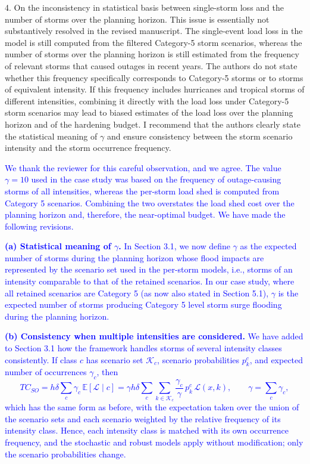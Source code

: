 \documentclass[authoryear,preprint,review,12pt]{elsarticle}\usepackage{amssymb}
\begin{document}
\bigskip

4. On the inconsistency in statistical basis between single-storm loss and the number of storms over the planning horizon. This issue is essentially not substantively resolved in the revised manuscript. The single-event load loss in the model is still computed from the filtered Category-5 storm scenarios, whereas the number of storms over the planning horizon is still estimated from the frequency of relevant storms that caused outages in recent years. The authors do not state whether this frequency specifically corresponds to Category-5 storms or to storms of equivalent intensity. If this frequency includes hurricanes and tropical storms of different intensities, combining it directly with the load loss under Category-5 storm scenarios may lead to biased estimates of the load loss over the planning horizon and of the hardening budget. I recommend that the authors clearly state the statistical meaning of $\gamma$ and ensure consistency between the storm scenario intensity and the storm occurrence frequency.

\textcolor{blue}{We thank the reviewer for this careful observation, and we agree. The value $\gamma = 10$ used in the case study was based on the frequency of outage-causing storms of all intensities, whereas the per-storm load shed is computed from Category 5 scenarios. Combining the two overstates the load shed cost over the planning horizon and, therefore, the near-optimal budget. We have made the following revisions.}

\textcolor{blue}{\textbf{(a) Statistical meaning of $\gamma$.} In Section 3.1, we now define $\gamma$ as the expected number of storms during the planning horizon whose flood impacts are represented by the scenario set used in the per-storm models, i.e., storms of an intensity comparable to that of the retained scenarios. In our case study, where all retained scenarios are Category 5 (as now also stated in Section 5.1), $\gamma$ is the expected number of storms producing Category 5 level storm surge flooding during the planning horizon.}

\textcolor{blue}{\textbf{(b) Consistency when multiple intensities are considered.} We have added to Section 3.1 how the framework handles storms of several intensity classes consistently. If class $c$ has scenario set $\mathcal{K}_c$, scenario probabilities $p^c_k$, and expected number of occurrences $\gamma_c$, then
\begin{equation*}
    TC_{SO} = h \delta \sum_{c} \gamma_c \, \mathbb{E}[\mathcal{L} \mid c] = \gamma h \delta \sum_{c} \sum_{k \in \mathcal{K}_c} \frac{\gamma_c}{\gamma} \, p^c_k \, \mathcal{L}(x,k), \qquad \gamma = \sum_c \gamma_c,
\end{equation*}
which has the same form as before, with the expectation taken over the union of the scenario sets and each scenario weighted by the relative frequency of its intensity class. Hence, each intensity class is matched with its own occurrence frequency, and the stochastic and robust models apply without modification; only the scenario probabilities change.}
\end{document}
